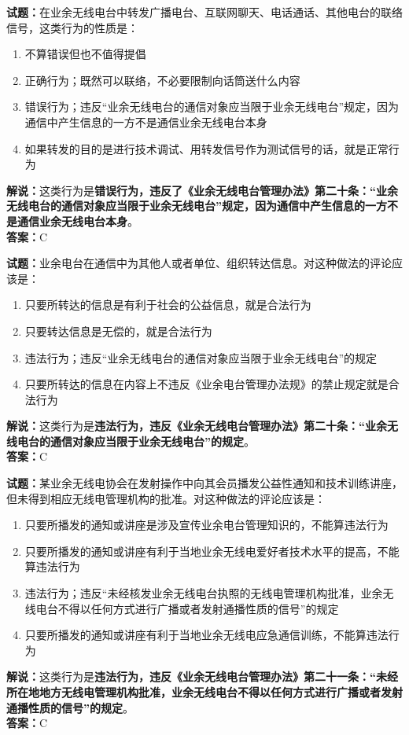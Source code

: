 \documentclass{ctexbook}
\begin{document}
\bigskip


\noindent\textbf{试题：}在业余无线电台中转发广播电台、互联网聊天、电话通话、其他电台的联络信号，这类行为的性质是：
\begin{enumerate}[leftmargin=3em]
	\item 不算错误但也不值得提倡
	\item 正确行为；既然可以联络，不必要限制向话筒送什么内容
	\item 错误行为；违反“业余无线电台的通信对象应当限于业余无线电台”规定，因为通信中产生信息的一方不是通信业余无线电台本身
	\item 如果转发的目的是进行技术调试、用转发信号作为测试信号的话，就是正常行为
\end{enumerate}
\noindent\textbf{解说：}这类行为是\textbf{错误行为，违反了《业余无线电台管理办法》第二十条：“业余无线电台的通信对象应当限于业余无线电台”规定，因为通信中产生信息的一方不是通信业余无线电台本身}。\\\noindent\textbf{答案：}C


\bigskip


\noindent\textbf{试题：}业余电台在通信中为其他人或者单位、组织转达信息。对这种做法的评论应该是：
\begin{enumerate}[leftmargin=3em]
	\item 只要所转达的信息是有利于社会的公益信息，就是合法行为
	\item 只要转达信息是无偿的，就是合法行为
	\item 违法行为；违反“业余无线电台的通信对象应当限于业余无线电台”的规定
	\item 只要所转达的信息在内容上不违反《业余电台管理办法规》的禁止规定就是合法行为
\end{enumerate}
\noindent\textbf{解说：}这类行为是\textbf{违法行为，违反《业余无线电台管理办法》第二十条：“业余无线电台的通信对象应当限于业余无线电台”的规定}。\\\noindent\textbf{答案：}C



\bigskip


\noindent\textbf{试题：}某业余无线电协会在发射操作中向其会员播发公益性通知和技术训练讲座，但未得到相应无线电管理机构的批准。对这种做法的评论应该是：
\begin{enumerate}[leftmargin=3em]
	\item 只要所播发的通知或讲座是涉及宣传业余电台管理知识的，不能算违法行为
	\item 只要所播发的通知或讲座有利于当地业余无线电爱好者技术水平的提高，不能算违法行为
	\item 违法行为；违反“未经核发业余无线电台执照的无线电管理机构批准，业余无线电台不得以任何方式进行广播或者发射通播性质的信号”的规定
	\item 只要所播发的通知或讲座有利于当地业余无线电应急通信训练，不能算违法行为
\end{enumerate}
\noindent\textbf{解说：}这类行为是\textbf{违法行为，违反《业余无线电台管理办法》第二十一条：“未经所在地地方无线电管理机构批准，业余无线电台不得以任何方式进行广播或者发射通播性质的信号”的规定}。\\\noindent\textbf{答案：}C
\end{document}

